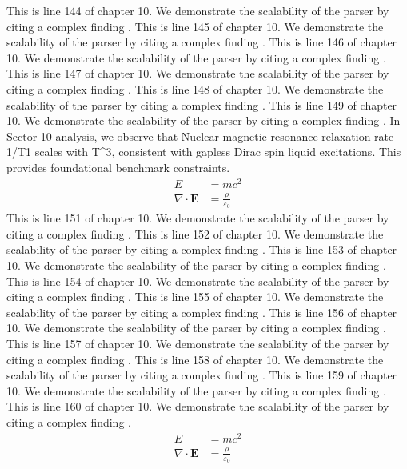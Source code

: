 This is line 144 of chapter 10. We demonstrate the scalability of the parser by citing a complex finding \cite{ref10_144}.
This is line 145 of chapter 10. We demonstrate the scalability of the parser by citing a complex finding \cite{ref10_145}.
This is line 146 of chapter 10. We demonstrate the scalability of the parser by citing a complex finding \cite{ref10_146}.
This is line 147 of chapter 10. We demonstrate the scalability of the parser by citing a complex finding \cite{ref10_147}.
This is line 148 of chapter 10. We demonstrate the scalability of the parser by citing a complex finding \cite{ref10_148}.
This is line 149 of chapter 10. We demonstrate the scalability of the parser by citing a complex finding \cite{ref10_149}.
In Sector 10 analysis, we observe that Nuclear magnetic resonance relaxation rate 1/T1 scales with T^3, consistent with gapless Dirac spin liquid excitations. This provides foundational benchmark constraints.
\begin{align*}
  E &= mc^2 \\
  \nabla \cdot \mathbf{E} &= \frac{\rho}{\varepsilon_0}
\end{align*}
This is line 151 of chapter 10. We demonstrate the scalability of the parser by citing a complex finding \cite{ref10_151}.
This is line 152 of chapter 10. We demonstrate the scalability of the parser by citing a complex finding \cite{ref10_152}.
This is line 153 of chapter 10. We demonstrate the scalability of the parser by citing a complex finding \cite{ref10_153}.
This is line 154 of chapter 10. We demonstrate the scalability of the parser by citing a complex finding \cite{ref10_154}.
This is line 155 of chapter 10. We demonstrate the scalability of the parser by citing a complex finding \cite{ref10_155}.
This is line 156 of chapter 10. We demonstrate the scalability of the parser by citing a complex finding \cite{ref10_156}.
This is line 157 of chapter 10. We demonstrate the scalability of the parser by citing a complex finding \cite{ref10_157}.
This is line 158 of chapter 10. We demonstrate the scalability of the parser by citing a complex finding \cite{ref10_158}.
This is line 159 of chapter 10. We demonstrate the scalability of the parser by citing a complex finding \cite{ref10_159}.
This is line 160 of chapter 10. We demonstrate the scalability of the parser by citing a complex finding \cite{ref10_160}.
\begin{align*}
  E &= mc^2 \\
  \nabla \cdot \mathbf{E} &= \frac{\rho}{\varepsilon_0}
\end{align*}
